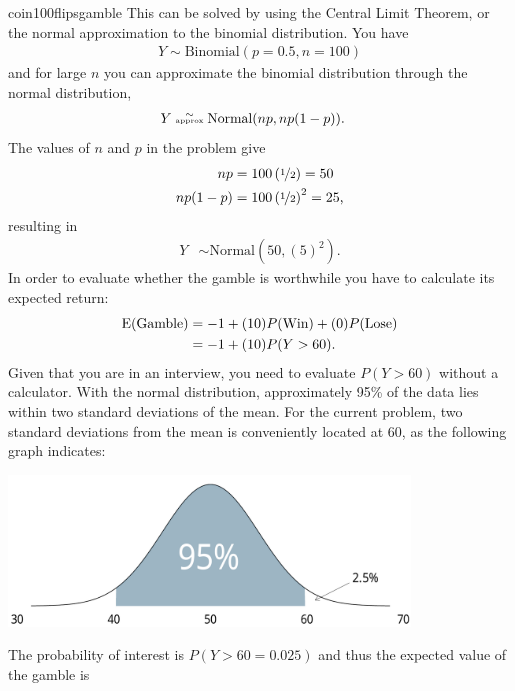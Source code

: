 \begin{answer}{coin100flipsgamble}
This can be solved by using the Central Limit Theorem, or the normal approximation to the binomial distribution.
You have
\begin{align*}
  Y \sim \text{Binomial}(p=0.5, n=100)
\end{align*}
and for large $n$ you can approximate the binomial distribution through the normal distribution,
\begin{align*}
  Y &\stackrel{\sim}{\text{\tiny approx}}  \text{Normal}(np, np(1-p))
  \text{.}
\end{align*}
The values of $n$ and $p$ in the problem give
\begin{align*}
  np      &= 100\left(\nicefrac{1}{2}\right)    = 50\\
  np(1-p) &= 100\left(\nicefrac{1}{2}\right)^2  = 25
  \text{,}
\end{align*}
resulting in
\begin{align*}
  Y & \sim
  \text{Normal}\left( 50, (5)^2 \right)
  \text{.}
\end{align*}
In order to evaluate whether the gamble is worthwhile you have to calculate its expected return:
\begin{align*}
  \operatorname{\mathrm{E}}(\text{Gamble}) &= -1 + (10)P(\text{Win})  + (0)P(\text{Lose}) \\
                    &= -1 + (10)P(Y>60)
                    \text{.}
\end{align*}
Given that you are in an interview, you need to evaluate $P(Y>60)$ without a calculator.
With the normal distribution, approximately 95\% of the data lies within two standard deviations of the mean.
For the current problem, two standard deviations from the mean is conveniently located at 60, as the following graph indicates:
\begin{center}
  \includegraphics[width=0.8\textwidth]{./plots/prettynorm/prettynorm.pdf}
\end{center}
The probability of interest is $P(Y>60 = 0.025)$ and thus the expected value of the gamble is

\end{answer}
